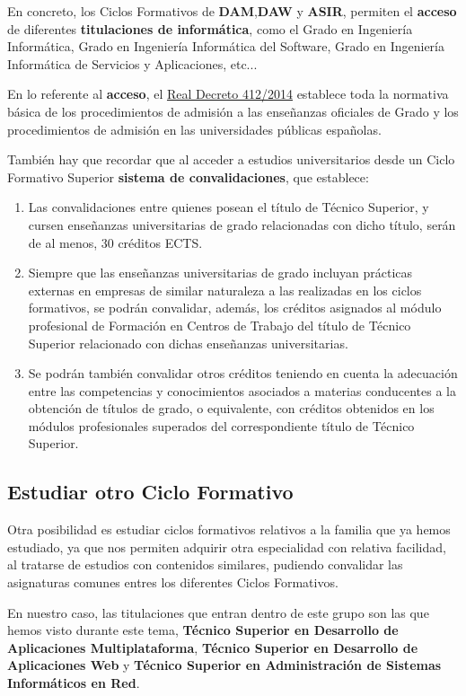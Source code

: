 En concreto, los Ciclos Formativos de \textbf{DAM},\textbf{DAW} y \textbf{ASIR}, permiten el \textbf{acceso} de diferentes \textbf{titulaciones de informática}, como el Grado en Ingeniería Informática, Grado en Ingeniería Informática del Software, Grado en Ingeniería Informática de Servicios y Aplicaciones, etc...

En lo referente al \textbf{acceso}, el \href{https://www.boe.es/diario\_boe/txt.php?id=BOE-A-2014-6008}{Real Decreto 412/2014} establece toda la normativa básica de los procedimientos de admisión a las enseñanzas oficiales de Grado y los procedimientos de admisión en las universidades públicas españolas.

También hay que recordar que al acceder a estudios universitarios desde un Ciclo Formativo Superior \textbf{sistema de convalidaciones}, que establece:

\begin{enumerate}
    \item Las convalidaciones entre quienes posean el título de Técnico Superior, y cursen enseñanzas universitarias de grado relacionadas con dicho título, serán de al menos, 30 créditos ECTS.
    \item Siempre que las enseñanzas universitarias de grado incluyan prácticas externas en empresas de similar naturaleza a las realizadas en los ciclos formativos, se podrán convalidar, además, los créditos asignados al módulo profesional de Formación en Centros de Trabajo del título de Técnico Superior relacionado con dichas enseñanzas universitarias.
    \item Se podrán también convalidar otros créditos teniendo en cuenta la adecuación entre las competencias y conocimientos asociados a materias conducentes a la obtención de títulos de grado, o equivalente, con créditos obtenidos en los módulos profesionales superados del correspondiente título de Técnico Superior.
\end{enumerate}

\subsection{Estudiar otro Ciclo Formativo}
Otra posibilidad es estudiar ciclos formativos relativos a la familia que ya hemos estudiado, ya que nos permiten adquirir otra especialidad con relativa facilidad, al tratarse de estudios con contenidos similares, pudiendo convalidar las asignaturas comunes entres los diferentes Ciclos Formativos.

En nuestro caso, las titulaciones que entran dentro de este grupo son las que hemos visto durante este tema, \textbf{Técnico Superior en Desarrollo de Aplicaciones Multiplataforma}, \textbf{Técnico Superior en Desarrollo de Aplicaciones Web} y \textbf{Técnico Superior en Administración de Sistemas Informáticos en Red}.


